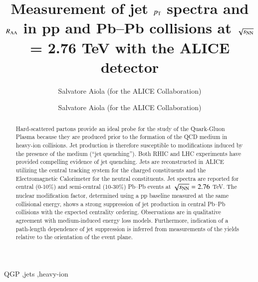 \documentclass[3p,times]{simplearticle}
\begin{document}
\ifarxiv
\else
\begin{frontmatter}
\fi


\title{Measurement of jet $p_{\rm T}$ spectra and $R_{\rm AA}$ in pp and Pb--Pb collisions at $\sqrt{s_{\rm NN}}$ = 2.76 TeV with the ALICE detector}

\ifarxiv
\author{Salvatore Aiola (for the ALICE Collaboration)}
\else
\author{Salvatore Aiola (for the ALICE Collaboration)}
\fi
{}
\ifarxiv
\else
{}
\fi
\address{Yale University, New Haven, CT 06520, USA}

\begin{abstract}
Hard-scattered partons provide an ideal probe for the study of the Quark-Gluon Plasma because they are produced prior to the formation 
of the QCD medium in heavy-ion collisions. 
Jet production is therefore susceptible to modifications induced by the presence of the medium (``jet quenching'').
Both RHIC and LHC experiments have provided compelling evidence of jet quenching. 
Jets are reconstructed in ALICE utilizing the central tracking system for the charged constituents 
and the Electromagnetic Calorimeter for the neutral constituents. Jet spectra are reported for central (0-10\%) and semi-central (10-30\%)
Pb--Pb events at $\sqrt{s_{\mathrm{NN}}}=2.76$ TeV. The nuclear modification factor, determined using a pp baseline measured at the same collisional energy,
shows a strong suppression of jet production in central Pb--Pb collisions with the expected centrality ordering. Observations are in qualitative
agreement with medium-induced energy loss models. Furthermore, indication of a path-length dependence of 
jet suppression is inferred from measurements
of the yields relative to the orientation of the event plane.
\end{abstract}

\ifarxiv
\else
\begin{keyword}
QGP \sep jets \sep heavy-ion

\end{keyword}

\end{frontmatter}
\fi
\end{document}

